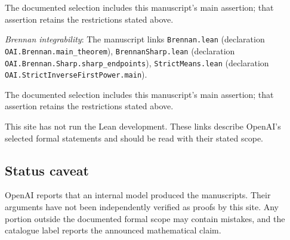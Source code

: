\documentclass[11pt]{article}
\begin{document}
The documented selection includes this manuscript’s main assertion; that assertion retains the restrictions stated above.

\textit{Brennan integrability}: The manuscript links \texttt{Brennan.lean} (declaration \texttt{OAI.Brennan.main\_theorem}), \texttt{BrennanSharp.lean} (declaration \texttt{OAI.Brennan.Sharp.sharp\_endpoints}), \texttt{StrictMeans.lean} (declaration \texttt{OAI.StrictInverseFirstPower.main}).

The documented selection includes this manuscript’s main assertion; that assertion retains the restrictions stated above.

This site has not run the Lean development. These links describe OpenAI’s selected formal statements and should be read with their stated scope.

\subsection{Status caveat}
OpenAI reports that an internal model produced the manuscripts. Their arguments have not been independently verified as proofs by this site. Any portion outside the documented formal scope may contain mistakes, and the catalogue label reports the announced mathematical claim.
\end{document}

